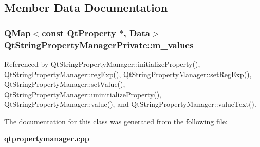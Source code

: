 \subsection{Member Data Documentation}
\subsubsection[{m\+\_\+values}]{\setlength{\rightskip}{0pt plus 5cm}Q\+Map$<$const {\bf Qt\+Property} $\ast$, {\bf Data}$>$ Qt\+String\+Property\+Manager\+Private\+::m\+\_\+values}\label{classQtStringPropertyManagerPrivate_a6313ba4465d0aff20be81a09b34ca68a}


Referenced by Qt\+String\+Property\+Manager\+::initialize\+Property(), Qt\+String\+Property\+Manager\+::reg\+Exp(), Qt\+String\+Property\+Manager\+::set\+Reg\+Exp(), Qt\+String\+Property\+Manager\+::set\+Value(), Qt\+String\+Property\+Manager\+::uninitialize\+Property(), Qt\+String\+Property\+Manager\+::value(), and Qt\+String\+Property\+Manager\+::value\+Text().



The documentation for this class was generated from the following file\+:\begin{DoxyCompactItemize}
\item 
{\bf qtpropertymanager.\+cpp}\end{DoxyCompactItemize}
